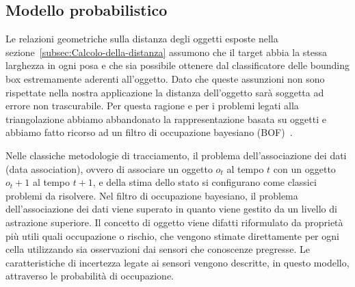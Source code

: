 \documentclass[10pt]{beamer}
\begin{document}
	
	
	\subsection{Modello probabilistico}\label{subsec:Modello-probabilistico}
	Le relazioni geometriche sulla distanza degli oggetti esposte nella
	sezione~\ref{subsec:Calcolo-della-distanza} assumono che il target abbia la
	stessa larghezza in ogni posa e che sia possibile ottenere dal
	classificatore delle bounding box estremamente aderenti all'oggetto. Dato che queste
	assunzioni non sono rispettate nella nostra applicazione la distanza
	dell'oggetto sarà soggetta ad errore non trascurabile. Per questa
	ragione e per i problemi legati alla triangolazione abbiamo abbandonato la
	rappresentazione basata su oggetti e abbiamo fatto ricorso ad un filtro di
	occupazione bayesiano (BOF)~\cite{tay2008bayesian}.

	Nelle classiche metodologie di tracciamento, il problema dell'associazione
	dei dati (data association), ovvero di associare un oggetto $o_t$ al tempo
	$t$ con un oggetto $o_t+1$ al tempo $t+1$, e della stima dello stato si
	configurano come classici problemi da risolvere. Nel filtro di occupazione
	bayesiano, il problema dell'associazione dei dati viene superato in quanto
	viene gestito da un livello di astrazione superiore. Il concetto di oggetto
	viene difatti riformulato da proprietà più utili quali occupazione o
	rischio, che vengono stimate direttamente per ogni cella utilizzando sia
	osservazioni dai sensori che conoscenze pregresse. Le caratteristiche di
	incertezza legate ai sensori vengono descritte, in questo modello,
	attraverso le probabilità di occupazione.
\end{document}
